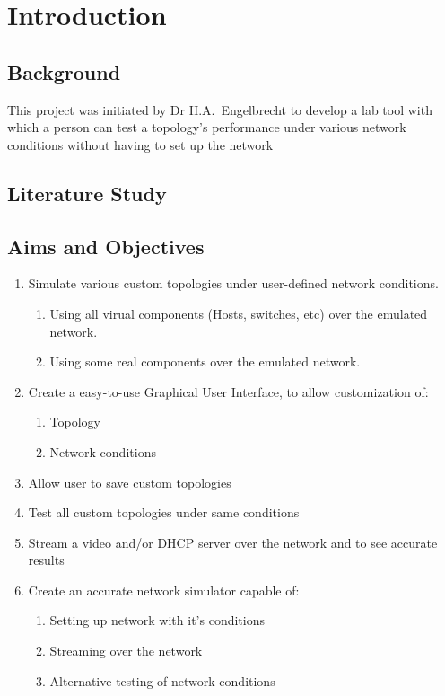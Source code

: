 \graphicspath{ {GUI/} }
\chapter{Introduction}
\section{Background}

This project was initiated by Dr H.A.\ Engelbrecht to develop a lab tool with which a person can test
a topology's performance under various network conditions without having to set up the network\\

\section{Literature Study}
\section{Aims and Objectives}

\begin{enumerate}
\item Simulate various custom topologies under  user-defined network conditions.
\begin{enumerate}
\item Using all virual components (Hosts, switches, etc) over the emulated network.
\item Using some real components over the emulated network.
\end{enumerate}
\item Create a easy-to-use Graphical User Interface, to allow customization of:
\begin{enumerate}
\item Topology
\item Network conditions
\end{enumerate}
\item Allow user to save custom topologies
\item Test all custom topologies under same conditions
\item Stream a video and/or DHCP server over the network and to see accurate results
\item Create an accurate network simulator capable of:
\begin{enumerate}
\item Setting up network with it's conditions
\item Streaming over the network
\item Alternative testing of network conditions
\end{enumerate}
\end{enumerate}\newpage
